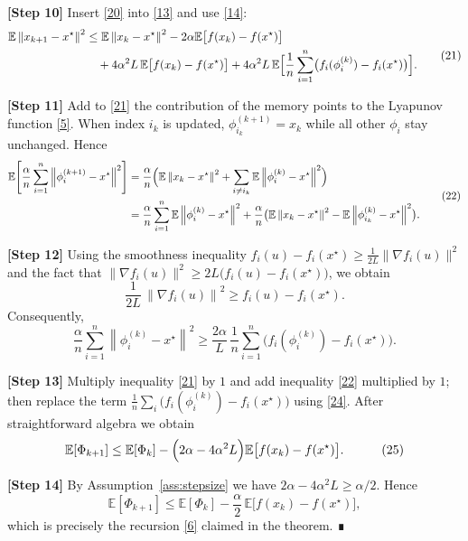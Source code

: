 \documentclass{article}
\newcommand{\E}{\mathbb{E}}
\newcommand{\norm}[1]{\left\lVert #1\right\rVert}
\begin{document}
\noindent\textbf{[Step 10]} Insert \eqref{20} into \eqref{13} and use \eqref{14}:
\[
\begin{aligned}
\E\norm{x_{k+1}-x^\star}^{2}
&\le \E\norm{x_k-x^\star}^{2}
-2\alpha\E\bigl[f(x_k)-f(x^\star)\bigr] \\
&\quad +4\alpha^{2}L\,\E\bigl[f(x_k)-f(x^\star)\bigr]
   +4\alpha^{2}L\,\E\Bigl[\frac1n\sum_{i=1}^{n}\bigl(f_i(\phi_i^{(k)})-f_i(x^\star)\bigr)\Bigr].
\end{aligned}
\tag{21}
\]

\noindent\textbf{[Step 11]} Add to \eqref{21} the contribution of the memory points to the Lyapunov function \eqref{5}.  
When index $i_k$ is updated, $\phi_{i_k}^{(k+1)}=x_k$ while all other $\phi_i$ stay unchanged. Hence
\[
\begin{aligned}
\E\!\left[\frac{\alpha}{n}\sum_{i=1}^{n}\norm{\phi_i^{(k+1)}-x^\star}^{2}\right]
&= \frac{\alpha}{n}\Bigl(\E\norm{x_k-x^\star}^{2}
     +\sum_{i\neq i_k}\E\norm{\phi_i^{(k)}-x^\star}^{2}\Bigr)\\
&= \frac{\alpha}{n}\sum_{i=1}^{n}\E\norm{\phi_i^{(k)}-x^\star}^{2}
   +\frac{\alpha}{n}\bigl(\E\norm{x_k-x^\star}^{2}
   -\E\norm{\phi_{i_k}^{(k)}-x^\star}^{2}\bigr).
\end{aligned}
\tag{22}
\]

\noindent\textbf{[Step 12]} Using the smoothness inequality $f_i(u)-f_i(x^\star)\ge\frac{1}{2L}\|\nabla f_i(u)\|^{2}$ and the fact that $\|\nabla f_i(u)\|^{2}\ge 2L\bigl(f_i(u)-f_i(x^\star)\bigr)$, we obtain
\[
\frac{1}{2L}\,\norm{\nabla f_i(u)}^{2}\ge f_i(u)-f_i(x^\star).
\tag{23}
\]
Consequently,
\[
\frac{\alpha}{n}\sum_{i=1}^{n}\norm{\phi_i^{(k)}-x^\star}^{2}
\ge \frac{2\alpha}{L}\,\frac1n\sum_{i=1}^{n}\bigl(f_i(\phi_i^{(k)})-f_i(x^\star)\bigr).
\tag{24}
\]

\noindent\textbf{[Step 13]} Multiply inequality \eqref{21} by $1$ and add inequality \eqref{22} multiplied by $1$; then replace the term $\frac1n\sum_{i}\bigl(f_i(\phi_i^{(k)})-f_i(x^\star)\bigr)$ using \eqref{24}. After straightforward algebra we obtain
\[
\begin{aligned}
\E[\Phi_{k+1}]
&\le \E[\Phi_k]
-\Bigl(2\alpha-4\alpha^{2}L\Bigr)\E\bigl[f(x_k)-f(x^\star)\bigr].
\end{aligned}
\tag{25}
\]

\noindent\textbf{[Step 14]} By Assumption~\ref{ass:stepsize} we have $2\alpha-4\alpha^{2}L\ge\alpha/2$. Hence
\[
\E[\Phi_{k+1}]
\le \E[\Phi_k]-\frac{\alpha}{2}\,\E\!\bigl[f(x_k)-f(x^\star)\bigr],
\]
which is precisely the recursion \eqref{6} claimed in the theorem. ∎
\end{document}
